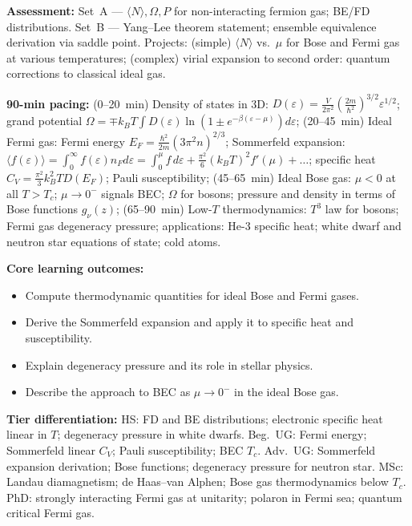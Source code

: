 \documentclass[11pt,a4paper]{article}
\begin{document}
\begin{tcolorbox}[modulebox, title={Module~II.7 --- Lecture L02: Canonical and Grand-Canonical Ensembles}]
\medskip\textbf{Assessment:}
Set~A --- $\langle N\rangle,\Omega,P$ for non-interacting fermion gas; BE/FD distributions.
Set~B --- Yang--Lee theorem statement; ensemble equivalence derivation via saddle point.
Projects: (simple) $\langle N\rangle$ vs.\ $\mu$ for Bose and Fermi gas at various temperatures;
(complex) virial expansion to second order: quantum corrections to classical ideal gas.
\end{tcolorbox}

\medskip

\begin{tcolorbox}[modulebox, title={Module~II.7 --- Lecture L03: Quantum Ideal Gases}]
\textbf{90-min pacing:} (0--20~min) Density of states in 3D: $D(\varepsilon)=\tfrac{V}{2\pi^2}(\tfrac{2m}{\hbar^2})^{3/2}\varepsilon^{1/2}$; grand potential $\Omega=\mp k_BT\int D(\varepsilon)\ln(1\pm e^{-\beta(\varepsilon-\mu)})d\varepsilon$; (20--45~min) Ideal Fermi gas: Fermi energy $E_F=\tfrac{\hbar^2}{2m}(3\pi^2n)^{2/3}$; Sommerfeld expansion: $\langle f(\varepsilon)\rangle=\int_0^\infty f(\varepsilon)n_F d\varepsilon=\int_0^\mu f\,d\varepsilon+\tfrac{\pi^2}{6}(k_BT)^2f'(\mu)+\ldots$; specific heat $C_V=\tfrac{\pi^2}{3}k_B^2TD(E_F)$; Pauli susceptibility; (45--65~min) Ideal Bose gas: $\mu<0$ at all $T>T_c$; $\mu\to 0^-$ signals BEC; $\Omega$ for bosons; pressure and density in terms of Bose functions $g_\nu(z)$; (65--90~min) Low-$T$ thermodynamics: $T^3$ law for bosons; Fermi gas degeneracy pressure; applications: He-3 specific heat; white dwarf and neutron star equations of state; cold atoms.

\medskip\textbf{Core learning outcomes:}
\begin{itemize}[leftmargin=1.4em,topsep=2pt,itemsep=1pt]
  \item Compute thermodynamic quantities for ideal Bose and Fermi gases.
  \item Derive the Sommerfeld expansion and apply it to specific heat and susceptibility.
  \item Explain degeneracy pressure and its role in stellar physics.
  \item Describe the approach to BEC as $\mu\to 0^-$ in the ideal Bose gas.
\end{itemize}

\medskip\textbf{Tier differentiation:}
HS: FD and BE distributions; electronic specific heat linear in $T$; degeneracy pressure in white dwarfs.
Beg.\ UG: Fermi energy; Sommerfeld linear $C_V$; Pauli susceptibility; BEC $T_c$.
Adv.\ UG: Sommerfeld expansion derivation; Bose functions; degeneracy pressure for neutron star.
MSc: Landau diamagnetism; de Haas--van Alphen; Bose gas thermodynamics below $T_c$.
PhD: strongly interacting Fermi gas at unitarity; polaron in Fermi sea; quantum critical Fermi gas.


\end{tcolorbox}
\end{document}
